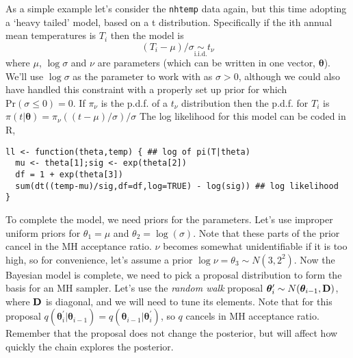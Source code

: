 \documentclass[10pt] {article}
\theoremstyle{definition}
\begin{document}
As a simple example let's consider the {\tt nhtemp} data again, but this time adopting a `heavy tailed' model, based on a t distribution.
Specifically if the ith annual mean temperatures is $T_i$ then the model is
$$
(T_i - \mu)/\sigma \underset{\text{i.i.d.}}{\sim} t_\nu
$$
where $\mu$, $\log \sigma$ and $\nu$ are parameters (which can be written in one vector, $\bm \theta$). We'll use $\log \sigma$ as the parameter to work with as $\sigma>0$, although we could also have handled this constraint with a properly set up prior for which $\text{Pr}(\sigma \le 0) = 0$. If $\pi_\nu$ is the p.d.f. of a $t_\nu$ distribution then the p.d.f. for $T_i$ is
$
\pi(t|{\bm \theta}) = \pi_\nu((t-\mu)/\sigma) /\sigma
$
The log likelihood for this model can be coded in R,
\begin{lstlisting}
ll <- function(theta,temp) { ## log of pi(T|theta)
  mu <- theta[1];sig <- exp(theta[2]) 
  df = 1 + exp(theta[3])
  sum(dt((temp-mu)/sig,df=df,log=TRUE) - log(sig)) ## log likelihood
}
\end{lstlisting}
To complete the model, we need priors for the parameters. Let's use improper uniform priors for $\theta_1 = \mu$ and $\theta_2=\log(\sigma)$.
Note that these parts of the prior cancel in the MH acceptance ratio. $\nu$ becomes somewhat unidentifiable if it is too high, so for convenience, let's assume a prior $\log \nu = \theta_3 \sim N(3,2^2)$. Now the Bayesian model is complete, we need to pick a proposal distribution to form the basis for an MH sampler. 
Let's use the {\em random walk} proposal ${\bm \theta}_i^\prime \sim N({\bm \theta}_{i-1},{\bf D})$, where $\bf D$ is diagonal, and we will need to tune its elements. Note that for this proposal $q({\bm \theta}_i^\prime|{\bm \theta}_{i-1}) = q({\bm \theta}_{i-1}|{\bm \theta}^\prime_i)$, so $q$ cancels in MH acceptance ratio. Remember that the proposal does not change the posterior, but will affect how quickly the chain explores the posterior. 
\end{document}

